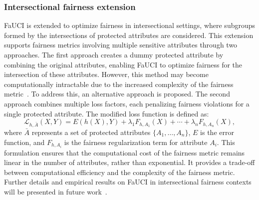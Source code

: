 \subsubsection{Intersectional fairness extension}\label{subsubsec:intersectional-fairness}
%
\Gls{FaUCI} is extended to optimize fairness in intersectional settings, where subgroups formed by the intersections of protected attributes are considered.
%
This extension supports fairness metrics involving multiple sensitive attributes through two approaches.
%
The first approach creates a dummy protected attribute by combining the original attributes, enabling \gls{FaUCI} to optimize fairness for the intersection of these attributes.
%
However, this method may become computationally intractable due to the increased complexity of the fairness metric~\cite{placeholder}.
%
To address this, an alternative approach is proposed.
%
The second approach combines multiple loss factors, each penalizing fairness violations for a single protected attribute.
%
The modified loss function is defined as:
%
\begin{equation}
    \label{eq:intersectional_loss}
    \mathcal{L}_{h,\bar{A}}(X, Y) = E(h(X), Y) + \lambda_1 F_{h,A_1}(X) + \cdots + \lambda_n F_{h,A_n}(X),
\end{equation}
%
where \(\bar{A}\) represents a set of protected attributes \(\{A_1, \ldots, A_n\}\), \(E\) is the error function, and \(F_{h,A_i}\) is the fairness regularization term for attribute \(A_i\).
%
This formulation ensures that the computational cost of the fairness metric remains linear in the number of attributes, rather than exponential.
%
It provides a trade-off between computational efficiency and the complexity of the fairness metric.
%
Further details and empirical results on \gls{FaUCI} in intersectional fairness contexts will be presented in future work~\cite{placeholder}.
